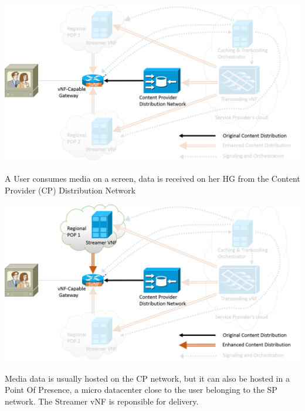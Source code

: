 \documentclass[a4paper]{beamer}
\begin{document}
\begin{frame}[plain,T]{}
	\centering
	\includegraphics[width=0.95\linewidth]{highleveldesign1.png}
	\vspace{2em}
	\begin{block}{}
		A User consumes media on a screen, data is received on her HG from the Content Provider (CP) Distribution Network
	\end{block}
	
\end{frame}

\begin{frame}[plain,T]{}
	\centering
	\includegraphics[width=0.95\linewidth]{highleveldesign2.png}
	\vspace{1em}
	\begin{block}{}
		Media data is usually hosted on the CP network, but it can also be hosted in a Point Of Presence, a micro datacenter close to the user belonging to the SP network. The Streamer vNF is reponsible for delivery.
	\end{block}
\end{frame}
\end{document}
